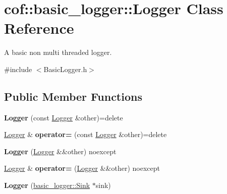 \hypertarget{classcof_1_1basic__logger_1_1_logger}{}\section{cof\+:\+:basic\+\_\+logger\+:\+:Logger Class Reference}
\label{classcof_1_1basic__logger_1_1_logger}


A basic non multi threaded logger.  




{\ttfamily \#include $<$Basic\+Logger.\+h$>$}

\subsection*{Public Member Functions}
\begin{DoxyCompactItemize}
\item 
\mbox{\label{classcof_1_1basic__logger_1_1_logger_a6eb22968894b3b6c344e0a1899cf447d}} 
{\bfseries Logger} (const \hyperlink{classcof_1_1basic__logger_1_1_logger}{Logger} \&other)=delete
\item 
\mbox{\label{classcof_1_1basic__logger_1_1_logger_aa4d66cb63a0579fe8396e18d8bdbc058}} 
\hyperlink{classcof_1_1basic__logger_1_1_logger}{Logger} \& {\bfseries operator=} (const \hyperlink{classcof_1_1basic__logger_1_1_logger}{Logger} \&other)=delete
\item 
\mbox{\label{classcof_1_1basic__logger_1_1_logger_ade6a4cfbf519c776bcebc3cd0cf1e240}} 
{\bfseries Logger} (\hyperlink{classcof_1_1basic__logger_1_1_logger}{Logger} \&\&other) noexcept
\item 
\mbox{\label{classcof_1_1basic__logger_1_1_logger_aa011d07c00035c9df2387589c88c02d8}} 
\hyperlink{classcof_1_1basic__logger_1_1_logger}{Logger} \& {\bfseries operator=} (\hyperlink{classcof_1_1basic__logger_1_1_logger}{Logger} \&\&other) noexcept
\item 
\mbox{\label{classcof_1_1basic__logger_1_1_logger_a583530f90c7f07510bc89e9521180a05}} 
{\bfseries Logger} (\hyperlink{classcof_1_1basic__logger_1_1_sink}{basic\+\_\+logger\+::\+Sink} $\ast$sink)

\end{DoxyCompactItemize}
